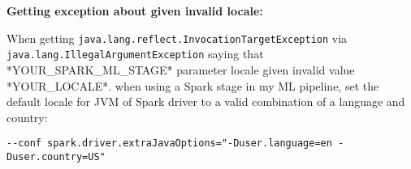 \textbf{Getting exception about given invalid locale:}

When getting \texttt{java.lang.reflect.InvocationTargetException} via \texttt{java.lang.IllegalArgumentException} saying that \\
*YOUR\_SPARK\_ML\_STAGE* parameter locale given invalid value *YOUR\_LOCALE*. when using a Spark stage in my ML pipeline,
set the default locale for JVM of Spark driver to a valid combination of a language and country:

\begin{lstlisting}[style=Bash]
--conf spark.driver.extraJavaOptions="-Duser.language=en -Duser.country=US"
\end{lstlisting}
